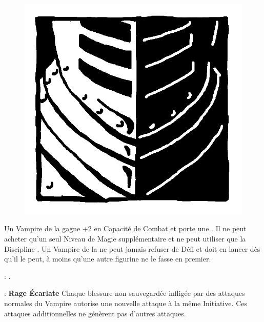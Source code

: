 \begin{figure}
\centering
\includegraphics[width=\logosize]{logos/logo_brotherhood.png}
\end{figure}
Un Vampire de la \brotherhood{} gagne +2 en Capacité de Combat et porte une \platearmour{}. Il ne peut acheter qu'un seul Niveau de Magie supplémentaire et ne peut utiliser que la Discipline \necromancy{}. Un Vampire de la \brotherhood{} ne peut jamais refuser de Défi et doit en lancer dès qu'il le peut, à moins qu'une autre figurine ne le fasse en premier.

\vspace{0.5cm}
\bloodtie{} : \textbf{\vampireknights{}}.

\vspace{0.5cm}
\ancientbloodpower{} : \textbf{Rage Écarlate}\dotfill{}\newline%
Chaque blessure non sauvegardée infligée par des attaques normales du Vampire autorise une nouvelle attaque à la même Initiative. Ces attaques additionnelles ne génèrent pas d'autres attaques.


